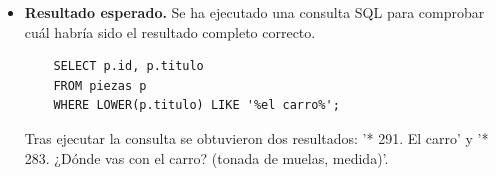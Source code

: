 \begin{itemize}
*   **291. El carro**
*   **283. ¿Donde vas con el carro? (tonada de muelos medida)**"
    \item \textbf{Resultado esperado.} Se ha ejecutado una consulta SQL para comprobar cuál habría sido el resultado completo correcto.
    \begin{verbatim} 
    SELECT p.id, p.titulo
    FROM piezas p
    WHERE LOWER(p.titulo) LIKE '%el carro%';
    \end{verbatim}
    Tras ejecutar la consulta se obtuvieron dos resultados: '* 291. El carro' y '* 283. ¿Dónde vas con el carro? (tonada de muelas, medida)'.


\end{itemize}


